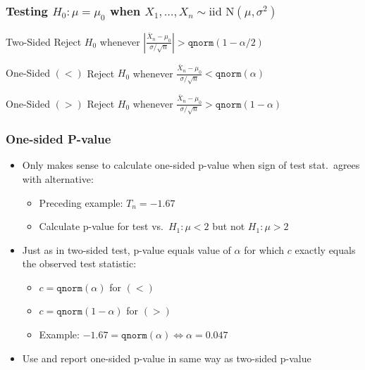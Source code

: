 \begin{frame}
  \frametitle{Testing $H_0\colon \mu = \mu_0$ when $X_1, \dots, X_n \sim \mbox{iid N}(\mu, \sigma^2)$}

  \begin{block}{Two-Sided}
    Reject $H_0$ whenever $\displaystyle \left|\frac{\bar{X}_n - \mu_0}{\sigma/\sqrt{n}}\right|> \texttt{qnorm}(1 - \alpha/2)$ 
  \end{block}

  \begin{block}{One-Sided $(<)$}
    Reject $H_0$ whenever $\displaystyle \frac{\bar{X}_n - \mu_0}{\sigma/\sqrt{n}} < \texttt{qnorm}(\alpha)$ 
  \end{block}

  \begin{block}{One-Sided $(>)$}
    Reject $H_0$ whenever $\displaystyle \frac{\bar{X}_n - \mu_0}{\sigma/\sqrt{n}} > \texttt{qnorm}(1 - \alpha)$ 
  \end{block}


\end{frame}
\begin{frame}
  \frametitle{One-sided P-value}

  \small

  \begin{itemize}
    \item Only makes sense to calculate one-sided p-value when sign of test stat.\ agrees with alternative: \pause
      \begin{itemize}
        \item Preceding example: $T_n = -1.67$  \pause
        \item Calculate p-value for test vs.\ $H_1\colon \mu < 2$ but \alert{not $H_1\colon \mu >2$} \pause
      \end{itemize}
    \item Just as in two-sided test, p-value equals value of $\alpha$ for which $c$ exactly equals the observed test statistic: \pause
      \begin{itemize}
        \item $c = \texttt{qnorm}(\alpha)$ for $(<)$ \pause
        \item $c = \texttt{qnorm}(1 - \alpha)$ for $(>)$ \pause
        \item Example: $-1.67 = \texttt{qnorm}(\alpha) \iff \alpha = 0.047$ \pause
      \end{itemize}
    \item Use and report  one-sided p-value in same way as two-sided p-value
  \end{itemize}


\end{frame}
